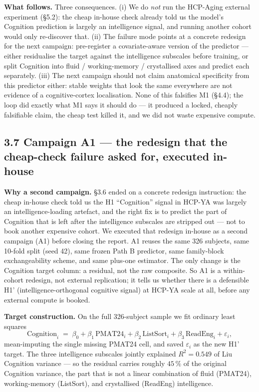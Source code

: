 \documentclass[11pt,letterpaper]{report}
\begin{document}
\textbf{What follows.} Three consequences. (i) We do \emph{not} run the HCP-Aging external experiment (\S5.2): the cheap in-house check already told us the model's Cognition prediction is largely an intelligence signal, and running another cohort would only re-discover that. (ii) The failure mode points at a concrete redesign for the next campaign: pre-register a covariate-aware version of the predictor --- either residualise the target against the intelligence subscales before training, or split Cognition into fluid / working-memory / crystallised axes and predict each separately. (iii) The next campaign should not claim anatomical specificity from this predictor either: stable weights that look the same everywhere are not evidence of a cognitive-cortex localisation. None of this falsifies M1 (\S4.4); the loop did exactly what M1 says it should do --- it produced a locked, cheaply falsifiable claim, the cheap test killed it, and we did not waste expensive compute.

\subsection*{3.7 Campaign A1 --- the redesign that the cheap-check failure asked for, executed in-house}

\textbf{Why a second campaign.} \S3.6 ended on a concrete redesign instruction: the cheap in-house check told us the H1 ``Cognition'' signal in HCP-YA was largely an intelligence-loading artefact, and the right fix is to predict the part of Cognition that is left after the intelligence subscales are stripped out --- not to book another expensive cohort. We executed that redesign in-house as a second campaign (A1) before closing the report. A1 reuses the same 326 subjects, same 10-fold split (seed 42), same frozen Path B predictor, same family-block exchangeability scheme, and same plus-one estimator. The only change is the Cognition target column: a residual, not the raw composite. So A1 is a within-cohort redesign, not external replication; it tells us whether there is a defensible H1' (intelligence-orthogonal cognitive signal) at HCP-YA scale at all, before any external compute is booked.

\textbf{Target construction.} On the full 326-subject sample we fit ordinary least squares
\[
\text{Cognition}_i \;=\; \beta_0 + \beta_1\,\text{PMAT24}_i + \beta_2\,\text{ListSort}_i + \beta_3\,\text{ReadEng}_i + \varepsilon_i,
\]
mean-imputing the single missing PMAT24 cell, and saved $\varepsilon_i$ as the new H1' target. The three intelligence subscales jointly explained $R^2 = 0.549$ of Liu Cognition variance --- so the residual carries roughly $45\,\%$ of the original Cognition variance, the part that is not a linear combination of fluid (PMAT24), working-memory (ListSort), and crystallised (ReadEng) intelligence.
\end{document}
